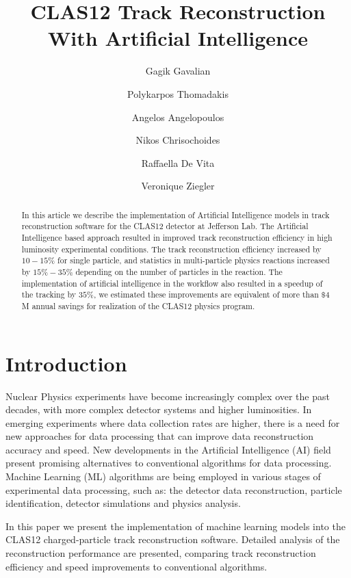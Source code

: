 \documentclass[preprint,12pt]{elsarticle}
\title{CLAS12 Track Reconstruction With Artificial Intelligence }
\author[1]{Gagik Gavalian}
\author[2]{Polykarpos Thomadakis}
\author[2]{Angelos Angelopoulos}
\author[2]{Nikos Chrisochoides}
\author[3]{Raffaella De Vita}
\author[1]{Veronique Ziegler}
\begin{document}
\begin{abstract}

  In this article we describe the implementation of Artificial Intelligence models in track reconstruction software for the CLAS12 detector at Jefferson Lab.
 The Artificial Intelligence based approach resulted in improved track reconstruction efficiency in high luminosity experimental conditions.  The track
 reconstruction efficiency increased by $10-15\%$ for single particle, and statistics in multi-particle physics reactions increased by $15\%-35\%$ depending 
 on the number of particles in the reaction. The implementation of artificial intelligence in the workflow also resulted in a speedup of the tracking by $35\%$, 
 we estimated these improvements are equivalent of more than $\$4$M  annual savings for realization of the CLAS12 physics program.
\end{abstract}
\maketitle


\section{Introduction}
\indent

Nuclear Physics experiments have become increasingly complex over the past decades, with more complex detector systems and higher luminosities. In emerging experiments where data collection rates are higher, there is a need for new approaches for data processing that can improve data reconstruction accuracy and speed. New developments in the Artificial Intelligence (AI) field present promising alternatives to conventional algorithms for data processing. Machine Learning (ML) algorithms are being employed in various stages of experimental data processing, such as: the detector data reconstruction, particle identification, detector simulations and physics analysis. 

In this paper we present the implementation of machine learning models into the CLAS12 charged-particle track reconstruction software. Detailed analysis 
of the reconstruction performance are presented, comparing track reconstruction efficiency and speed improvements to conventional algorithms.





\end{document}
